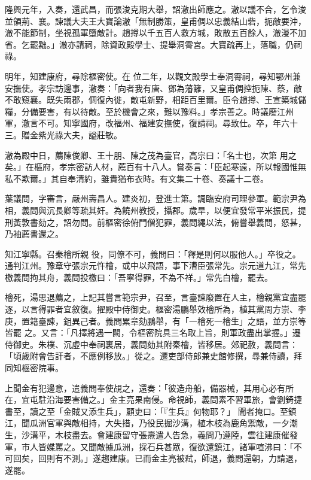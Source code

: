 \begin{pinyinscope}
 隆興元年，入奏，還武昌，而張浚克期大舉，詔澈出師應之。澈以議不合，乞令浚並領荊、襄。諫議大夫王大寶論澈「無制勝策，皇甫倜以忠義結山砦，扼敵要沖，澈不能節制，坐視孤軍墮敵計。趙撙以千五百人救方城，敗散五百餘人，澈漫不加省。乞罷黜。」澈亦請祠，除資政殿學士、提舉洞霄宮。大寶疏再上，落職，仍祠祿。



 明年，知建康府，尋除樞密使。在
 位二年，以觀文殿學士奉洞霄祠，尋知鄂州兼安撫使。孝宗訪邊事，澈奏：「向者我有唐、鄧為藩籬，又皇甫倜控扼陳、蔡，敵不敢窺襄。既失兩郡，倜復內徙，敵屯新野，相距百里爾。臣令趙撙、王宣築城儲糧，分備要害，有以待敵。至於機會之來，難以豫料。」孝宗善之。時議廢江州軍，澈言不可。知寧國府，改福州、福建安撫使，復請祠。尋致仕。卒，年六十三。贈金紫光祿大夫，謚莊敏。



 澈為殿中日，薦陳俊卿、王十朋、陳之茂為臺官，高宗曰：「名士也，次第
 用之矣。」在樞府，孝宗密訪人材，薦百有十八人。嘗奏言：「臣起寒遠，所以報國惟無私不欺爾。」其自奉清約，雖貴猶布衣時。有文集二十卷、奏議十二卷。



 葉議問，字審言，嚴州壽昌人。建炎初，登進士第。調臨安府司理參軍。範宗尹為相，義問與沉長卿等疏其奸。為饒州教授，攝郡。歲旱，以便宜發常平米振民，提刑黃敦書劾之，詔勿問。前樞密徐俯門僧犯罪，義問繩以法，俯嘗舉義問，怒甚，乃袖薦書還之。



 知江寧縣。召秦檜所親
 役，同僚不可，義問曰：「釋是則何以服他人。」卒役之。通判江州。豫章守張宗元忤檜，或中以飛語，事下漕臣張常先。宗元道九江，常先檄義問拘其舟，義問投檄曰：「吾寧得罪，不為不祥。」常先白檜，罷去。



 檜死，湯思退薦之，上記其嘗言範宗尹，召至，言臺諫廢置在人主，檜親黨宜盡罷逐，以言得罪者宜敘復。擢殿中侍御史。樞密湯鵬舉效檜所為，植其黨周方崇、李庚，置籍臺諫，鉏異己者。義問累章劾鵬舉，有「一檜死一檜生」之語，並方崇等皆罷
 之。又言：「凡擇將遇一闕，令樞密院具三名取上旨，則軍政盡出掌握。」遷侍御史。朱樸、沉虛中奉祠裏居，義問劾其附秦檜，皆移居。郊祀赦，義問言：「頃歲附會告訐者，不應例移放。」從之。遷吏部侍郎兼史館修撰，尋兼侍讀，拜同知樞密院事。



 上聞金有犯邊意，遣義問奉使覘之，還奏：「彼造舟船，備器械，其用心必有所在，宜屯駐沿海要害備之。」金主亮果南侵。命視師，義問素不習軍旅，會劉錡捷書至，讀之至「金賊又添生兵」，顧吏曰：「『生兵』何物耶？」
 聞者掩口。至鎮江，聞瓜洲官軍與敵相持，大失措，乃役民掘沙溝，植木枝為鹿角禦敵，一夕潮生，沙溝平，木枝盡去。會建康留守張燾遣人告急，義問乃遵陸，雲往建康催發軍，市人皆媟罵之。又聞敵據瓜洲，採石兵甚眾，復欲還鎮江，諸軍喧沸曰：「不可回矣，回則有不測。」遂趨建康。已而金主亮被弒，師退，義問還朝，力請退，遂罷。




\end{pinyinscope}

